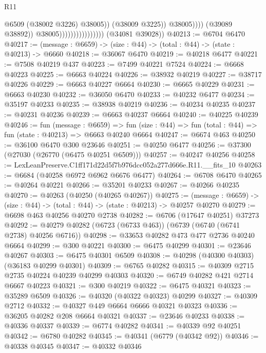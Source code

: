 \begin{lexlean}{R11}
\begin{coremodule}
                                                      @6509
                                                      (@38002 @3226)
                                                      @38005))
                                                  (@38009 @3225))
                                                @38005))))
                                        (@39089 @38892))
                                      @38005))))))))))))))))
      (@34081 @39028))
@40213 := @6704 @6470
@40217 := (message : @6659) -> (size : @44) -> (total : @44) -> (state : @40213) -> @6660
@40218 := @36067 @6470
@40219 := @40218 @6477
@40221 := @7508 @40219 @437
@40223 := @7499 @40221 @7524
@40224 := @6668 @40223
@40225 := @6663 @40224
@40226 := @38932 @40219
@40227 := @38717 @40226
@40229 := @6663 @40227 @6664
@40230 := @6665 @40229
@40231 := @6663 @40230
@40232 := @36050 @6470
@40233 := @40232 @6477
@40234 := @35197 @40233
@40235 := @38938 @40219
@40236 := @40234 @40235
@40237 := @40231 @40236
@40239 := @6663 @40237 @6664
@40240 := @40225 @40239
@40246 := fun (message : @6659) =>
  fun (size : @44) => fun (total : @44) => fun (state : @40213) => @6663 @40240 @6664
@40247 := @6674 @463
@40250 := @36100 @6470 @300 @23646
@40251 := @40250 @6477
@40256 := @37300 (@27030 (@26770 (@6475 @40251 @6509)))
@40257 := @40247 @40256
@40258 := LexLeanPreserve.C1ff171d22d5f7b976dcc052a277d666e.R11.__fits_10
@40263 := @6684 (@40258 @6972 @6962 @6676 @6477)
@40264 := @6708 @6470
@40265 := @40264 @40221
@40266 := @35201 @40233
@40267 := @40266 @40235
@40270 := @40263 (@40250 (@40265 @40267))
@40275 := (message : @6659) -> (size : @44) -> (total : @44) -> (state : @40213) -> @40257 @40270
@40279 := @6698 @463 @40256 @40270 @2738
@40282 := @6706 (@17647 @40251) @37273
@40292 := @40279 @40282 (@6723 (@6733 @463)) (@6739 (@6740 (@6741 @2738) @40256 @6716))
@40298 := @33653 @40282 @473 @477 @2736 @40240 @6664
@40299 := @300 @40221
@40300 := @6475 @40299
@40301 := @23646 @40267
@40303 := @6475 @40301 @6509
@40308 := @40298 (@40300 @40303) (@36183 @40299 @40301)
@40309 := @6765 @40282
@40315 := @40309 @2715 @2735 @40224 @40239 @40299 @40303
@40320 := @6749 @40282 @421 @2714 @6667 @40223
@40321 := @300 @40219
@40322 := @6475 @40321
@40323 := @35289 @6509
@40326 := @40320 (@40322 @40323) @40299
@40327 := @40309 @2712
@40332 := @40327 @449 @6664 @6666 @40321 @40323
@40336 := @36205 @40282 @208 @6664 @40321
@40337 := @23646 @40233
@40338 := @40336 @40337
@40339 := @6774 @40282
@40341 := @40339 @92 @40251
@40342 := @6780 @40282
@40345 := @40341 (@6779 (@40342 @92))
@40346 := @40338 @40345
@40347 := @40332 @40346

\end{coremodule}
\end{lexlean}
